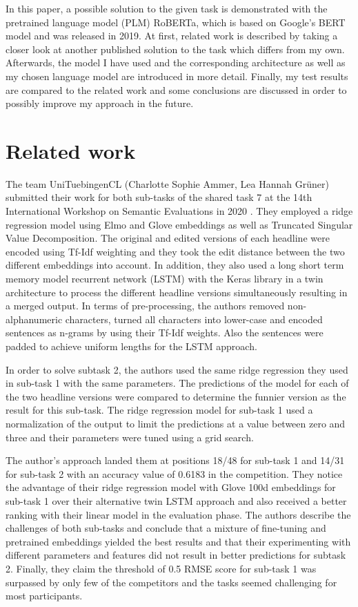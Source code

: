 \documentclass[11pt,a4paper,onecolumn,oneside,notitlepage]{article}
\begin{document}
    In this paper, a possible solution to the given task is demonstrated with the pretrained language model (PLM) RoBERTa, which is based on Google's BERT model and was released in 2019. At first, related work is described by taking a closer look at another published solution to the task which differs from my own. Afterwards, the model I have used and the corresponding architecture as well as my chosen language model are introduced in more detail. Finally, my test results are compared to the related work and some conclusions are discussed in order to possibly improve my approach in the future.


    \section{Related work}
    The team UniTuebingenCL (Charlotte Sophie Ammer, Lea Hannah Grüner) submitted their work for both sub-tasks of the shared task 7 at the 14th International Workshop on Semantic Evaluations in 2020 \citep{ammer-gruner-2020-unituebingencl}. They employed a ridge regression model using Elmo and Glove embeddings as well as Truncated Singular Value Decomposition. The original and edited versions of each headline were encoded using Tf-Idf weighting and they took the edit distance between the two different embeddings into account. In addition, they also used a long short term memory model recurrent network (LSTM) with the Keras library in a twin architecture to process the different headline versions simultaneously resulting in a merged output. In terms of pre-processing, the authors removed non-alphanumeric characters, turned all characters into lower-case and encoded sentences as n-grams by using their Tf-Idf weights. Also the sentences were padded to achieve uniform lengths for the LSTM approach.

    In order to solve subtask 2, the authors used the same ridge regression they used in sub-task 1 with the same parameters. The predictions of the model for each of the two headline versions were compared to determine the funnier version as the result for this sub-task. The ridge regression model for sub-task 1 used a normalization of the output to limit the predictions at a value between zero and three and their parameters were tuned using a grid search.

    The author's approach landed them at positions 18/48 for sub-task 1 and 14/31 for sub-task 2 with an accuracy value of 0.6183 in the competition. They notice the advantage of their ridge regression model with Glove 100d embeddings for sub-task 1 over their alternative twin LSTM approach and also received a better ranking with their linear model in the evaluation phase. The authors describe the challenges of both sub-tasks and conclude that a mixture of fine-tuning and pretrained embeddings yielded the best results and that their experimenting with different parameters and features did not result in better predictions for subtask 2. Finally, they claim the threshold of 0.5 RMSE score for sub-task 1 was surpassed by only few of the competitors and the tasks seemed challenging for most participants.
\end{document}
